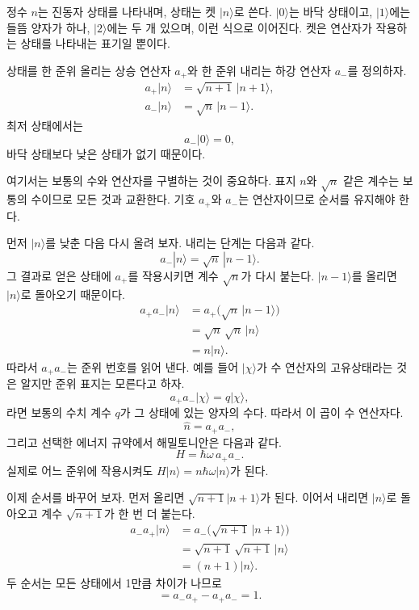 정수 \(n\)는 진동자 상태를 나타내며, 상태는 켓 \(|n\rangle\)로 쓴다. \(|0\rangle\)는 바닥 상태이고, \(|1\rangle\)에는 들뜸 양자가 하나, \(|2\rangle\)에는 두 개 있으며, 이런 식으로 이어진다. 켓은 연산자가 작용하는 상태를 나타내는 표기일 뿐이다.

상태를 한 준위 올리는 상승 연산자 \(a_+\)와 한 준위 내리는 하강 연산자 \(a_-\)를 정의하자. \begin{align}
a_+|n\rangle &= \sqrt{n+1}\,|n+1\rangle,\\
a_-|n\rangle &= \sqrt{n}\,|n-1\rangle.
\end{align} 최저 상태에서는 \begin{equation}
a_-|0\rangle=0,
\end{equation} 바닥 상태보다 낮은 상태가 없기 때문이다.

여기서는 보통의 수와 연산자를 구별하는 것이 중요하다. 표지 \(n\)와 \(\sqrt n\) 같은 계수는 보통의 수이므로 모든 것과 교환한다. 기호 \(a_+\)와 \(a_-\)는 연산자이므로 순서를 유지해야 한다.

먼저 \(|n\rangle\)를 낮춘 다음 다시 올려 보자. 내리는 단계는 다음과 같다. \begin{equation}
a_-|n\rangle=\sqrt n\,|n-1\rangle.
\end{equation} 그 결과로 얻은 상태에 \(a_+\)를 작용시키면 계수 \(\sqrt n\)가 다시 붙는다. \(|n-1\rangle\)를 올리면 \(|n\rangle\)로 돌아오기 때문이다. \begin{align}
a_+a_-|n\rangle
&=a_+\bigl(\sqrt n\,|n-1\rangle\bigr)\\
&=\sqrt n\,\sqrt n\,|n\rangle\\
&=n|n\rangle.
\end{align} 따라서 \(a_+a_-\)는 준위 번호를 읽어 낸다. 예를 들어 \(|\chi\rangle\)가 수 연산자의 고유상태라는 것은 알지만 준위 표지는 모른다고 하자. \begin{equation}
a_+a_-|\chi\rangle=q|\chi\rangle,
\end{equation}라면 보통의 수치 계수 \(q\)가 그 상태에 있는 양자의 수다. 따라서 이 곱이 수 연산자다. \begin{equation}
\hat n=a_+a_-,
\end{equation} 그리고 선택한 에너지 규약에서 해밀토니안은 다음과 같다. \begin{equation}
H=\hbar\omega\,a_+a_-.
\end{equation} 실제로 어느 준위에 작용시켜도 \(H|n\rangle=n\hbar\omega|n\rangle\)가 된다.

이제 순서를 바꾸어 보자. 먼저 올리면 \(\sqrt{n+1}|n+1\rangle\)가 된다. 이어서 내리면 \(|n\rangle\)로 돌아오고 계수 \(\sqrt{n+1}\)가 한 번 더 붙는다. \begin{align}
a_-a_+|n\rangle
&=a_-\bigl(\sqrt{n+1}\,|n+1\rangle\bigr)\\
&=\sqrt{n+1}\,\sqrt{n+1}\,|n\rangle\\
&=(n+1)|n\rangle.
\end{align} 두 순서는 모든 상태에서 1만큼 차이가 나므로 \begin{equation}
[a_-,a_+]=a_-a_+-a_+a_-=1.
\end{equation}

